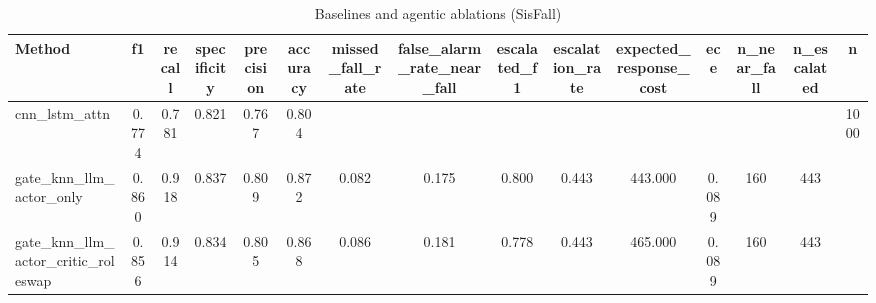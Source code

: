 \begin{table}[t]
\centering
\caption{Baselines and agentic ablations (SisFall)}
\begin{tabular}{lcccccccccccccc}
\toprule
Method & f1 & recall & specificity & precision & accuracy & missed_fall_rate & false_alarm_rate_near_fall & escalated_f1 & escalation_rate & expected_response_cost & ece & n_near_fall & n_escalated & n \\
\midrule
cnn_lstm_attn & 0.774 & 0.781 & 0.821 & 0.767 & 0.804 &  &  &  &  &  &  &  &  & 1000 \\
gate_knn_llm_actor_only & 0.860 & 0.918 & 0.837 & 0.809 & 0.872 & 0.082 & 0.175 & 0.800 & 0.443 & 443.000 & 0.089 & 160 & 443 &  \\
gate_knn_llm_actor_critic_roleswap & 0.856 & 0.914 & 0.834 & 0.805 & 0.868 & 0.086 & 0.181 & 0.778 & 0.443 & 465.000 & 0.089 & 160 & 443 &  \\
\bottomrule
\end{tabular}
\end{table}
